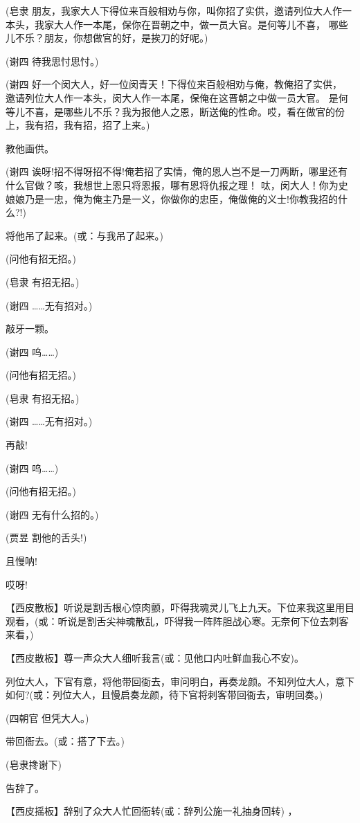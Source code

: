 (皂隶 朋友，我家大人下得位来百般相劝与你，叫你招了实供，邀请列位大人作一
本头，我家大人作一本尾，保你在晋朝之中，做一员大官。是何等儿不喜，
哪些儿不乐？朋友，你想做官的好，是挨刀的好呢。)

(谢四 待我思忖思忖。)

(谢四 好一个闵大人，好一位闵青天！下得位来百般相劝与俺，教俺招了实供，
邀请列位大人作一本头，闵大人作一本尾，保俺在这晋朝之中做一员大官。
是何等儿不喜，是哪些儿不乐？我为报他人之恩，断送俺的性命。哎，看在做官的份上，我有招，我有招，招了上来。)

教他画供。

(谢四
诶呀!招不得呀招不得!俺若招了实情，俺的恩人岂不是一刀两断，哪里还有什么官做？咳，我想世上恩只将恩报，哪有恩将仇报之理！
呔，闵大人！你为史娘娘乃是一忠，俺为俺主乃是一义，你做你的忠臣，俺做俺的义士!你教我招的什么?!)

将他吊了起来。(或：与我吊了起来。)

(问他有招无招。)

(皂隶 有招无招。)

(谢四 \ldots{}\ldots{}无有招对。)

敲牙一颗。

(谢四 呜\ldots{}\ldots{})

(问他有招无招。)

(皂隶 有招无招。)

(谢四 \ldots{}\ldots{}无有招对。)

再敲!

(谢四 呜\ldots{}\ldots{})

(问他有招无招。)

(谢四 无有什么招的。)

(贾昱 割他的舌头!)

且慢呐!

哎呀!

【西皮散板】听说是割舌根心惊肉颤，吓得我魂灵儿飞上九天。下位来我这里用目观看，(或：听说是割舌尖神魂散乱，吓得我一阵阵胆战心寒。无奈何下位去刺客来看，)

【西皮散板】尊一声众大人细听我言(或：见他口内吐鲜血我心不安)。

列位大人，下官有意，将他带回衙去，审问明白，再奏龙颜。不知列位大人，意下如何?(或：列位大人，且慢启奏龙颜，待下官将刺客带回衙去，审明回奏。)

(四朝官 但凭大人。)

带回衙去。(或：搭了下去。)

(皂隶搀谢下)

告辞了。

【西皮摇板】辞别了众大人忙回衙转(或：辞列公施一礼抽身回转) ，

